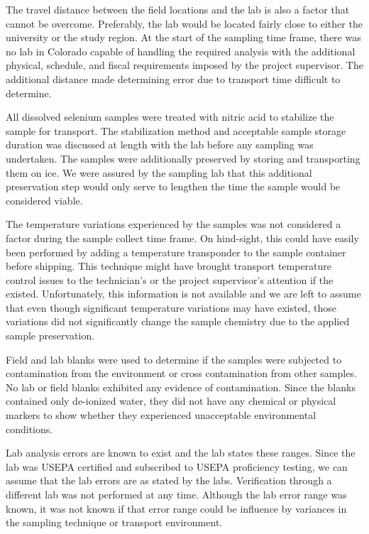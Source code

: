 \begin{linenumbers}
The travel distance between the field locations and the lab is also a factor that cannot be overcome.  Preferably, the lab would be located fairly close to either the university or the study region.  At the start of the sampling time frame, there was no lab in Colorado capable of handling the required analysis with the additional physical, schedule, and fiscal requirements imposed by the project supervisor.  The additional distance made determining error due to transport time difficult to determine.

All dissolved selenium samples were treated with nitric acid to stabilize the sample for transport.  The stabilization method and acceptable sample storage duration was discussed at length with the lab before any sampling was undertaken.  The samples were additionally preserved by storing and transporting them on ice.  We were assured by the sampling lab that this additional preservation step would only serve to lengthen the time the sample would be considered viable.

The temperature variations experienced by the samples was not considered a factor during the sample collect time frame.  On hind-sight, this could have easily been performed by adding a temperature transponder to the sample container before shipping.  This technique might have brought transport temperature control issues to the technician's or the project supervisor's attention if the existed.  Unfortunately, this information is not available and we are left to assume that even though significant temperature variations may have existed, those variations did not significantly change the sample chemistry due to the applied sample preservation.

Field and lab blanks were used to determine if the samples were subjected to contamination from the environment or cross contamination from other samples.  No lab or field blanks exhibited any evidence of contamination.  Since the blanks contained only de-ionized water, they did not have any chemical or physical markers to show whether they experienced unacceptable environmental conditions.

Lab analysis errors are known to exist and the lab states these ranges.  Since the lab was USEPA certified and subscribed to USEPA proficiency testing, we can assume that the lab errors are as stated by the labs.  Verification through a different lab was not performed at any time.  Although the lab error range was known,  it was not known if that error range could be influence by variances in the sampling technique or transport environment.  


\end{linenumbers}
